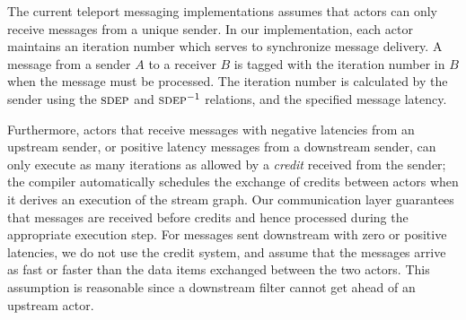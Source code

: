 The current teleport messaging implementations assumes that actors
can only receive messages from a unique sender.
In our implementation, each actor maintains an iteration number which
serves to synchronize message delivery. A message from a sender $A$ to
a receiver $B$ is tagged with the iteration number in $B$ when the
message must be processed. The iteration number is calculated by the
sender using the $\textsc{sdep}$ and $\textsc{sdep}^{-1}$ relations, and the specified
message latency.

Furthermore, actors that receive messages with negative latencies from
an upstream sender, or positive latency messages from a downstream sender, 
can only execute as many iterations as allowed by a
{\it credit} received from the sender; the compiler automatically
schedules the exchange  of credits between actors when it derives an
execution of the stream graph. Our communication layer guarantees that
messages are received before credits and hence processed during the
appropriate execution step.
For messages sent downstream with zero or positive latencies, we
do not use the credit system, and assume that the messages arrive as fast or
faster than the data items exchanged between the two actors. This
assumption is reasonable since a downstream filter cannot get 
ahead of an upstream actor.

                                                                                                     
